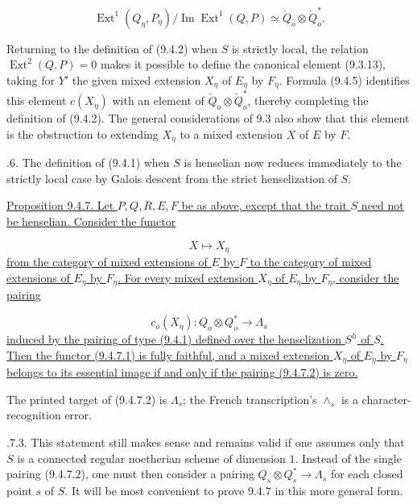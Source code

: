 \begin{equation}\tag{9.4.5}
\operatorname{Ext}^1(Q_\eta,P_\eta)/
\operatorname{Im}\operatorname{Ext}^1(Q,P)
\simeq\check Q_o\otimes\check Q_o^*.
\end{equation}

Returning to the definition of (9.4.2) when $S$ is strictly local, the
relation $\operatorname{Ext}^2(Q,P)=0$ makes it possible to define the
canonical element (9.3.13), taking for $Y'$ the given mixed extension
$X_\eta$ of $E_\eta$ by $F_\eta$. Formula (9.4.5) identifies this element
$c(X_\eta)$ with an element of $\check Q_o\otimes\check Q_o^*$, thereby
completing the definition of (9.4.2). The general considerations of 9.3
also show that this element is the obstruction to extending $X_\eta$ to a
mixed extension $X$ of $E$ by $F$.

\medskip
{}.6. The definition of (9.4.1) when $S$ is henselian now reduces
immediately to the strictly local case by Galois descent from the strict
henselization of $S$.

\medskip
\noindent
\underline{Proposition 9.4.7. Let $P,Q,R,E,F$ be as above, except that the
trait $S$ need not be henselian. Consider the functor}

\begin{equation}\tag{9.4.7.1}
X\longmapsto X_\eta
\end{equation}
\underline{from the category of mixed extensions of $E$ by $F$ to the
category of mixed extensions of $E_\eta$ by $F_\eta$. For every mixed
extension $X_\eta$ of $E_\eta$ by $F_\eta$, consider the pairing}

\begin{equation}\tag{9.4.7.2}
c_o(X_\eta):Q_o\otimes Q_o^*\longrightarrow\Lambda_s
\end{equation}
\underline{induced by the pairing of type (9.4.1) defined over the
henselization $S^h$ of $S$. Then the functor (9.4.7.1) is fully faithful,
and a mixed extension $X_\eta$ of $E_\eta$ by $F_\eta$ belongs to its
essential image if and only if the pairing (9.4.7.2) is zero.}

The printed target of (9.4.7.2) is $\Lambda_s$; the French transcription's
$\wedge_s$ is a character-recognition error.

\medskip
{}.7.3. This statement still makes sense and remains valid if one assumes
only that $S$ is a connected regular noetherian scheme of dimension $1$.
Instead of the single pairing (9.4.7.2), one must then consider a pairing
$Q_s\otimes Q_s^*\longrightarrow\Lambda_s$ for each closed point $s$ of
$S$. It will be most convenient to prove 9.4.7 in this more general form.

